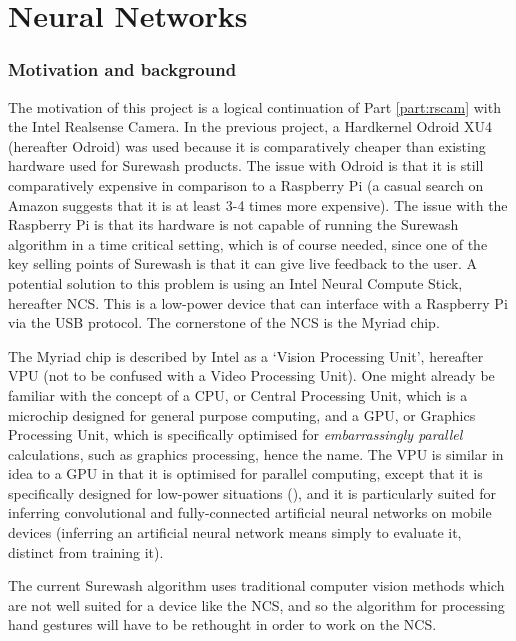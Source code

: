 \part{Neural Networks}
\section{Motivation and background}
The motivation of this project is a logical continuation of Part \ref{part:rscam} with the Intel Realsense Camera. In the previous project, a Hardkernel Odroid XU4 (hereafter Odroid) was used because it is comparatively cheaper than existing hardware used for Surewash products. The issue with Odroid is that it is still comparatively expensive in comparison to a Raspberry Pi (a casual search on Amazon suggests that it is at least 3-4 times more expensive). The issue with the Raspberry Pi is that its hardware is not capable of running the Surewash algorithm in a time critical setting, which is of course needed, since one of the key selling points of Surewash is that it can give live feedback to the user. A potential solution to this problem is using an Intel Neural Compute Stick, hereafter NCS. This is a low-power device that can interface with a Raspberry Pi via the USB protocol. The cornerstone of the NCS is the Myriad chip.

The Myriad chip is described by Intel as a `Vision Processing Unit', hereafter VPU (not to be confused with a Video Processing Unit). One might already be familiar with the concept of a CPU, or Central Processing Unit, which is a microchip designed for general purpose computing, and a GPU, or Graphics Processing Unit, which is specifically optimised for {\slshape embarrassingly parallel} calculations, such as graphics processing, hence the name. The VPU is similar in idea to a GPU in that it is optimised for parallel computing, except that it is specifically designed for low-power situations (\cite{7024073}), and it is particularly suited for inferring convolutional and fully-connected artificial neural networks on mobile devices (inferring an artificial neural network means simply to evaluate it, distinct from training it).

The current Surewash algorithm uses traditional computer vision methods which are not well suited for a device like the NCS, and so the algorithm for processing hand gestures will have to be rethought in order to work on the NCS.

